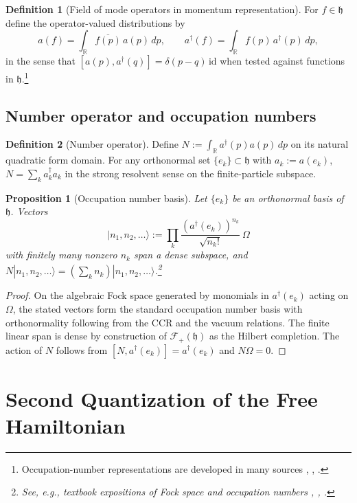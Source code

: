 \documentclass[11pt]{article}
\theoremstyle{definition}
\newtheorem{definition}{Definition}
\theoremstyle{plain}
\newtheorem{proposition}{Proposition}
\numberwithin{equation}{section}
\begin{document}
\begin{definition}[Field of mode operators in momentum representation]
For $f\in\mathfrak{h}$ define the operator-valued distributions by
\[
a(f)=\int_{\mathbb{R}} \overline{f(p)}\,a(p)\,dp,\qquad a^\dagger(f)=\int_{\mathbb{R}} f(p)\,a^\dagger(p)\,dp,
\]
in the sense that $[a(p),a^\dagger(q)]=\delta(p-q)\,\mathrm{id}$ when tested against functions in $\mathfrak{h}$.\footnote{Occupation-number representations are developed in many sources \cite[Sec.~1.4]{uiuc561}, \cite{scholarpedia}, \cite[Sec.~4.3]{libresecond}.}
\end{definition}

\subsection{Number operator and occupation numbers}

\begin{definition}[Number operator]
Define $N:=\int_{\mathbb{R}} a^\dagger(p)a(p)\,dp$ on its natural quadratic form domain. For any orthonormal set $\{e_k\}\subset\mathfrak{h}$ with $a_k:=a(e_k)$, $N=\sum_k a_k^\dagger a_k$ in the strong resolvent sense on the finite-particle subspace.
\end{definition}

\begin{proposition}[Occupation number basis]
Let $\{e_k\}$ be an orthonormal basis of $\mathfrak{h}$. Vectors
\[
|n_1,n_2,\dots\rangle:=\prod_{k} \frac{(a^\dagger(e_k))^{n_k}}{\sqrt{n_k!}}\ \Omega
\]
with finitely many nonzero $n_k$ span a dense subspace, and $N|n_1,n_2,\dots\rangle=\left(\sum_k n_k\right)|n_1,n_2,\dots\rangle$.\footnote{See, e.g., textbook expositions of Fock space and occupation numbers \cite[Sec.~1.4]{uiuc561}, \cite[Sec.~4.3]{libresecond}, \cite{scholarpedia}.}
\end{proposition}

\begin{proof}
On the algebraic Fock space generated by monomials in $a^\dagger(e_k)$ acting on $\Omega$, the stated vectors form the standard occupation number basis with orthonormality following from the CCR and the vacuum relations. The finite linear span is dense by construction of $\mathcal{F}_+(\mathfrak{h})$ as the Hilbert completion. The action of $N$ follows from $[N,a^\dagger(e_k)]=a^\dagger(e_k)$ and $N\Omega=0$.\end{proof}

\section{Second Quantization of the Free Hamiltonian}
\end{document}
